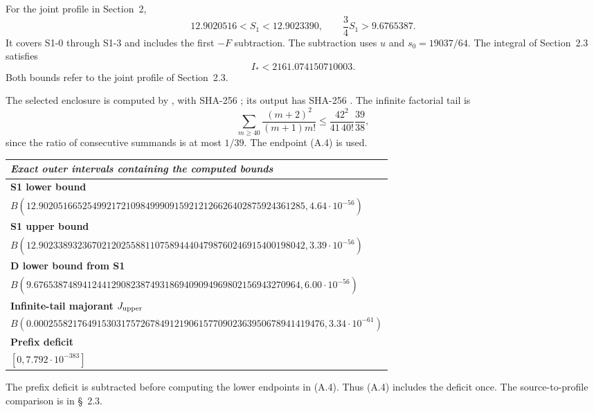 {For the joint profile in Section~2,
\[
 12.9020516<S_1<12.9023390,\qquad
 \frac34S_1>9.6765387.                                 \tag{A.4}
\]
It covers S1-0 through S1-3 and includes the first $-F$ subtraction.
The subtraction uses $u$ and $s_0=19037/64$.
The integral of Section~2.3 satisfies
\[ I_*<2161.074150710003. \]
Both bounds refer to the joint profile of Section~2.3.

The selected enclosure is computed by
,
with SHA-256
;
its output
has SHA-256
.
The infinite factorial tail is
\[
 \sum_{m\ge40}\frac{(m+2)^2}{(m+1)m!}
 \le\frac{42^2}{41\,40!}\frac{39}{38},                 \tag{A.5}
\]
since the ratio of consecutive summands is at most $1/39$.
The endpoint (A.4) is used.

{
\normalsize
\renewcommand{\arraystretch}{1.14}
\begin{longtable}{@{}p{\textwidth}@{}}
\toprule
\emph{Exact outer intervals containing the computed bounds} \\
\midrule
\textbf{S1 lower bound} \\
$B(12.9020516652549921721098499909159212126626402875924361285,4.64\cdot10^{-56})$ \\
\midrule
\textbf{S1 upper bound} \\
$B(12.9023389323670212025588110758944404798760246915400198042,3.39\cdot10^{-56})$ \\
\midrule
\textbf{D lower bound from S1} \\
$B(9.6765387489412441290823874931869409094969802156943270964,6.00\cdot10^{-56})$ \\
\midrule
\textbf{Infinite-tail majorant $J_{\rm upper}$} \\
$B(0.000255821764915303175726784912190615770902363950678941419476,3.34\cdot10^{-61})$ \\
\midrule
\textbf{Prefix deficit} \\
$[0,7.792\cdot10^{-383}]$ \\
\bottomrule
\end{longtable}
}

The prefix deficit is subtracted before computing the lower endpoints in (A.4).
Thus (A.4) includes the deficit once.
The source-to-profile comparison is in \S~2.3.

}
